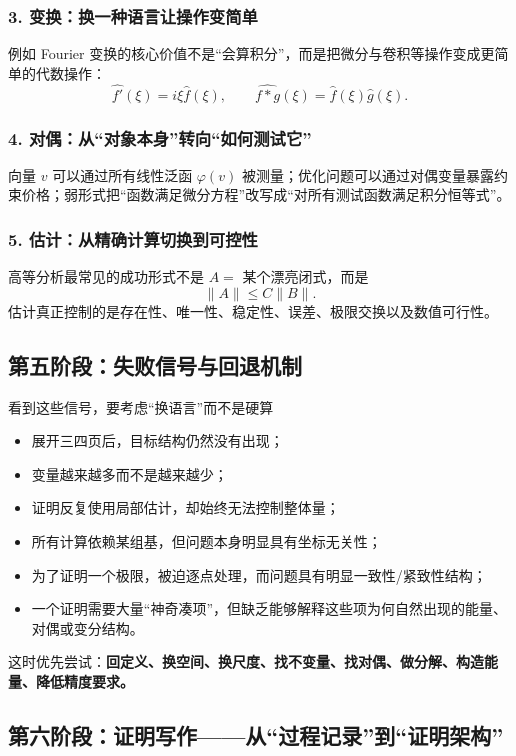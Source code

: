 \documentclass[11pt,a4paper]{ctexart}
\begin{document}
\subsubsection*{3. 变换：换一种语言让操作变简单}
例如 Fourier 变换的核心价值不是“会算积分”，而是把微分与卷积等操作变成更简单的代数操作：
\[
\widehat{f'}(\xi)=i\xi\widehat f(\xi),\qquad
\widehat{f*g}(\xi)=\widehat f(\xi)\widehat g(\xi).
\]

\subsubsection*{4. 对偶：从“对象本身”转向“如何测试它”}
向量 $v$ 可以通过所有线性泛函 $\varphi(v)$ 被测量；优化问题可以通过对偶变量暴露约束价格；弱形式把“函数满足微分方程”改写成“对所有测试函数满足积分恒等式”。

\subsubsection*{5. 估计：从精确计算切换到可控性}
高等分析最常见的成功形式不是 $A=$ 某个漂亮闭式，而是
\[
\|A\|\le C\|B\|.
\]
估计真正控制的是存在性、唯一性、稳定性、误差、极限交换以及数值可行性。

\subsection{第五阶段：失败信号与回退机制}

\begin{checkbox}{看到这些信号，要考虑“换语言”而不是硬算}
\begin{itemize}
  \item 展开三四页后，目标结构仍然没有出现；
  \item 变量越来越多而不是越来越少；
  \item 证明反复使用局部估计，却始终无法控制整体量；
  \item 所有计算依赖某组基，但问题本身明显具有坐标无关性；
  \item 为了证明一个极限，被迫逐点处理，而问题具有明显一致性/紧致性结构；
  \item 一个证明需要大量“神奇凑项”，但缺乏能够解释这些项为何自然出现的能量、对偶或变分结构。
\end{itemize}
\end{checkbox}

这时优先尝试：\textbf{回定义、换空间、换尺度、找不变量、找对偶、做分解、构造能量、降低精度要求。}

\subsection{第六阶段：证明写作——从“过程记录”到“证明架构”}
\end{document}
